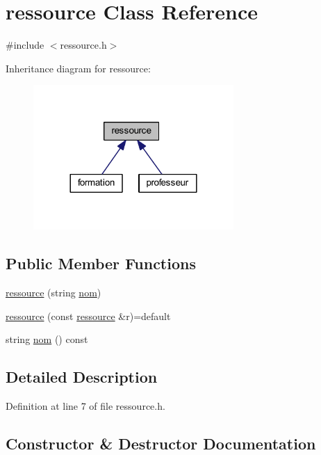 \hypertarget{classressource}{}\section{ressource Class Reference}
\label{classressource}


{\ttfamily \#include $<$ressource.\+h$>$}



Inheritance diagram for ressource\+:\nopagebreak
\begin{figure}[H]
\begin{center}
\leavevmode
\includegraphics[width=216pt]{classressource__inherit__graph}
\end{center}
\end{figure}
\subsection*{Public Member Functions}
\begin{DoxyCompactItemize}
\item 
\hyperlink{classressource_a261f4c729d03d562e1d35187999ce4ef}{ressource} (string \hyperlink{classressource_aff712b6d732b3f4091dd29f4349aba85}{nom})
\item 
\hyperlink{classressource_adccfe979d5ccf07ae4f0cfa944e9f1b0}{ressource} (const \hyperlink{classressource}{ressource} \&r)=default
\item 
string \hyperlink{classressource_aff712b6d732b3f4091dd29f4349aba85}{nom} () const
\end{DoxyCompactItemize}


\subsection{Detailed Description}


Definition at line 7 of file ressource.\+h.



\subsection{Constructor \& Destructor Documentation}
\hypertarget{classressource_a261f4c729d03d562e1d35187999ce4ef}{}\label{classressource_a261f4c729d03d562e1d35187999ce4ef} 
